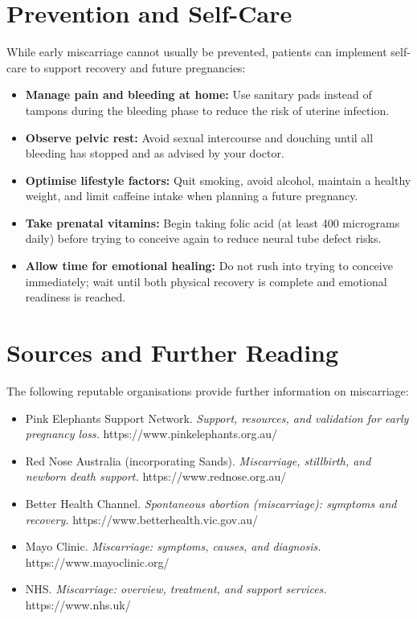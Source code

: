 \section*{Prevention and Self-Care}
While early miscarriage cannot usually be prevented, patients can implement self-care to support recovery and future pregnancies:
\begin{itemize}
    \item \textbf{Manage pain and bleeding at home:} Use sanitary pads instead of tampons during the bleeding phase to reduce the risk of uterine infection.
    \item \textbf{Observe pelvic rest:} Avoid sexual intercourse and douching until all bleeding has stopped and as advised by your doctor.
    \item \textbf{Optimise lifestyle factors:} Quit smoking, avoid alcohol, maintain a healthy weight, and limit caffeine intake when planning a future pregnancy.
    \item \textbf{Take prenatal vitamins:} Begin taking folic acid (at least 400 micrograms daily) before trying to conceive again to reduce neural tube defect risks.
    \item \textbf{Allow time for emotional healing:} Do not rush into trying to conceive immediately; wait until both physical recovery is complete and emotional readiness is reached.
\end{itemize}

\section*{Sources and Further Reading}
The following reputable organisations provide further information on miscarriage:
\begin{itemize}
    \item Pink Elephants Support Network. \textit{Support, resources, and validation for early pregnancy loss.} https://www.pinkelephants.org.au/
    \item Red Nose Australia (incorporating Sands). \textit{Miscarriage, stillbirth, and newborn death support.} https://www.rednose.org.au/
    \item Better Health Channel. \textit{Spontaneous abortion (miscarriage): symptoms and recovery.} https://www.betterhealth.vic.gov.au/
    \item Mayo Clinic. \textit{Miscarriage: symptoms, causes, and diagnosis.} https://www.mayoclinic.org/
    \item NHS. \textit{Miscarriage: overview, treatment, and support services.} https://www.nhs.uk/
\end{itemize}
